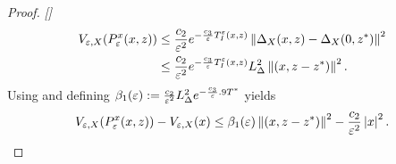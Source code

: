 \begin{proof}{\em []}
  \begin{align}
    \nonumber
    V_{\varepsilon, X}(P_{\varepsilon}^{x}(x, z)) &\leq \frac{c_{2}}{\varepsilon^{2}} e^{-\frac{c_{3}}{\varepsilon} T_{I}^{\varepsilon}(x, z)} \left\| \Delta_{X}(x, z) - \Delta_{X}(0, z^{*}) \right\|^{2}\\
    &\leq \frac{c_{2}}{\varepsilon^{2}} e^{-\frac{c_{3}}{\varepsilon} T_{I}^{\varepsilon}(x, z)} L_{\Delta}^{2} \left\|(x, z - z^{*})\right\|^{2}.
  \end{align}
  Using  and defining $\beta_{1}(\varepsilon) := \frac{c_{2}}{\varepsilon^{2}} L_{\Delta}^{2} e^{-\frac{c_{3}}{\varepsilon} .9 T^{*}}$ yields
  \begin{align}
    \label{eq:DVeX-bounds}
    V_{\varepsilon, X}(P_{\varepsilon}^{x}(x, z)) - V_{\varepsilon, X}(x) \leq \beta_{1}(\varepsilon) \left\|(x, z - z^{*})\right\|^{2} - \frac{c_{2}}{\varepsilon^{2}} \left|x\right|^{2}.
  \end{align}


\end{proof}
